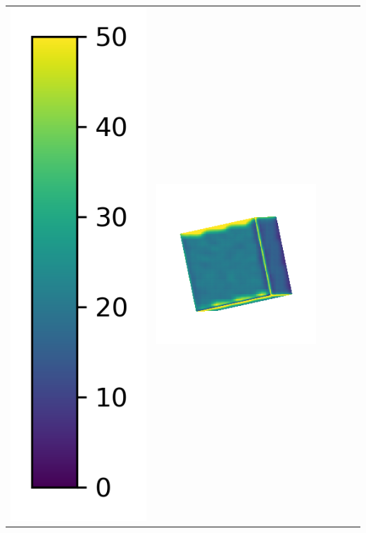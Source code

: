 \begin{tabularx}{\linewidth}{@{}Y@{}Y@{}Y@{}Y@{}Y@{}Y@{}}
\includegraphics[width=0.2\linewidth]{semisynthetic/colorbar_error_vertical.png} &
\includegraphics[width=\linewidth]{semisynthetic/20150514_0_ours_err.png} &

\end{tabularx}
